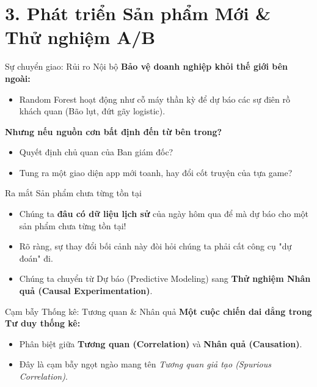 \documentclass[aspectratio=169]{beamer}
\begin{document}
\section{3. Phát triển Sản phẩm Mới \& Thử nghiệm A/B}

\begin{frame}{Sự chuyển giao: Rủi ro Nội bộ}
    \textbf{Bảo vệ doanh nghiệp khỏi thế giới bên ngoài:}
    \begin{itemize}
        \item Random Forest hoạt động như cỗ máy thần kỳ để dự báo các sự điên rồ khách quan (Bão lụt, đứt gãy logistic).
    \end{itemize}
    \vspace{0.3cm}
    \textbf{Nhưng nếu nguồn cơn bất định đến từ bên trong?}
    \begin{itemize}
        \item Quyết định chủ quan của Ban giám đốc?
        \item Tung ra một giao diện app mới toanh, hay đổi cốt truyện của tựa game?
    \end{itemize}
\end{frame}

\begin{frame}{Ra mắt Sản phẩm chưa từng tồn tại}
    \begin{itemize}
        \item Chúng ta \textbf{đâu có dữ liệu lịch sử} của ngày hôm qua để mà dự báo cho một sản phẩm chưa từng tồn tại!
        \item Rõ ràng, sự thay đổi bối cảnh này đòi hỏi chúng ta phải cất công cụ "dự đoán" đi.
        \item Chúng ta chuyển từ Dự báo (Predictive Modeling) sang \textbf{Thử nghiệm Nhân quả (Causal Experimentation)}.
    \end{itemize}
\end{frame}

\begin{frame}{Cạm bẫy Thống kê: Tương quan \& Nhân quả}
    \textbf{Một cuộc chiến dai dẳng trong Tư duy thống kê:}
    \begin{itemize}
        \item Phân biệt giữa \textbf{Tương quan (Correlation)} và \textbf{Nhân quả (Causation)}.
        \item Đây là cạm bẫy ngọt ngào mang tên \textit{Tương quan giả tạo (Spurious Correlation)}.
    \end{itemize}
\end{frame}
\end{document}
